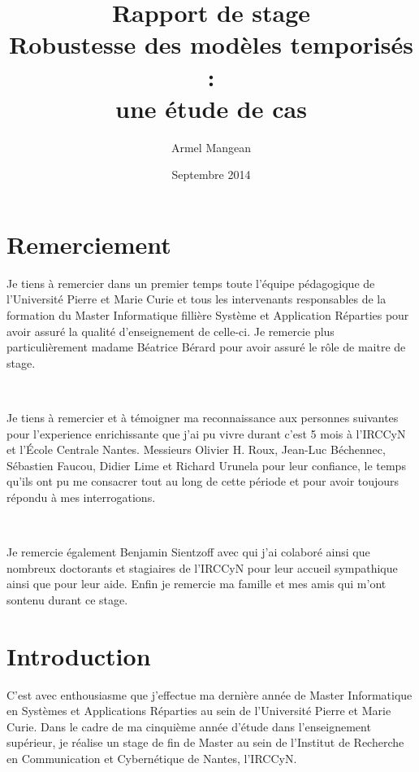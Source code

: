 \documentclass{report}
\title{Rapport de stage \\
  {\bf Robustesse des modèles temporisés : \\
    une étude de cas}}
\author{Armel Mangean}
\date{Septembre 2014}
\begin{document}
  \maketitle

  \chapter*{Remerciement}

    Je tiens à remercier dans un premier temps toute l'équipe pédagogique de
    l'Université Pierre et Marie Curie et tous les intervenants responsables de
    la formation du Master Informatique fillière Système et Application
    Réparties pour avoir assuré la qualité d'enseignement de celle-ci. Je
    remercie plus particulièrement madame Béatrice Bérard pour avoir assuré le
    rôle de maitre de stage.

    ~

    Je tiens à remercier et à témoigner ma reconnaissance aux personnes
    suivantes pour l'experience enrichissante que j'ai pu vivre durant c'est 5
    mois à l'IRCCyN et l'École Centrale Nantes. Messieurs Olivier H. Roux,
    Jean-Luc Béchennec, Sébastien Faucou, Didier Lime et Richard Urunela pour
    leur confiance, le temps qu'ils ont pu me consacrer tout au long de cette
    période et pour avoir toujours répondu à mes interrogations.

    ~

    Je remercie également Benjamin Sientzoff avec qui j'ai colaboré ainsi que
    nombreux doctorants et stagiaires de l'IRCCyN pour leur accueil sympathique
    ainsi que pour leur aide. Enfin je remercie ma famille et mes amis qui m'ont
    sontenu durant ce stage.

  \tableofcontents

  \chapter*{Introduction}

    C'est avec enthousiasme que j'effectue ma dernière année de Master
    Informatique en Systèmes et Applications Réparties au sein de l'Université
    Pierre et Marie Curie. Dans le cadre de ma cinquième année d'étude dans
    l'enseignement supérieur, je réalise un stage de fin de Master au sein de
    l'Institut de Recherche en Communication et Cybernétique de Nantes,
    l'IRCCyN.

    ~
    
\end{document}
